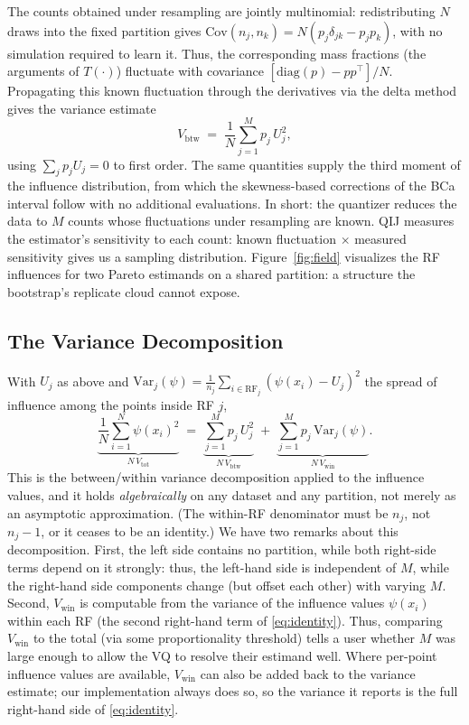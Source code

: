 \documentclass[runningheads]{llncs}
\newcommand{\ifl}{\psi}
\newcommand{\Vcell}{V_{\mathrm{btw}}}
\newcommand{\Vwithin}{V_{\mathrm{win}}}
\newcommand{\Vtotal}{V_{\mathrm{tot}}}
\begin{document}
The counts obtained under resampling are jointly multinomial: redistributing $N$ draws into the fixed partition gives $\mathrm{Cov}(n_j, n_k) = N(p_j \delta_{jk} - p_j p_k)$, with no simulation required to learn it. Thus, the corresponding mass fractions (the arguments of $T(\cdot)$) fluctuate with covariance $[\mathrm{diag}(p) - pp^{\top}]/N$. Propagating this known fluctuation through the derivatives via the delta method gives the variance estimate
\begin{equation}\label{eq:Vcell}
\Vcell \;=\; \frac1N \sum_{j=1}^{M} p_j\, U_j^{2},
\end{equation}
using $\sum_j p_j U_j = 0$ to first order. The same quantities supply the third moment of the influence distribution, from which the skewness-based corrections of the BCa interval \cite{efron1987} follow with no additional evaluations. In short: the quantizer reduces the data to $M$ counts whose fluctuations under resampling are known. QIJ measures the estimator's sensitivity to each count: known fluctuation $\times$ measured sensitivity gives us a sampling distribution. Figure~\ref{fig:field} visualizes the RF influences for two Pareto estimands on a shared partition: a structure the bootstrap's replicate cloud cannot expose.

\subsection{The Variance Decomposition}\label{sec:identity}

With $U_j$ as above and $\mathrm{Var}_j(\ifl) = \tfrac{1}{n_j}\sum_{i \in \mathrm{RF}_j}(\ifl(x_i) - U_j)^2$ the spread of influence among the points inside RF $j$,
\begin{equation}\label{eq:identity}
\underbrace{\frac1N\sum_{i=1}^{N} \ifl(x_i)^{2}}_{N\,\Vtotal}
\;=\;
\underbrace{\sum_{j=1}^{M} p_j\, U_j^{2}}_{N\,\Vcell}
\;+\;
\underbrace{\sum_{j=1}^{M} p_j\, \mathrm{Var}_j(\ifl)}_{N\,\Vwithin}.
\end{equation}
This is the between/within variance decomposition applied to the influence values, and it holds \emph{algebraically} on any dataset and any partition, not merely as an asymptotic approximation. (The within-RF denominator must be $n_j$, not $n_j{-}1$, or it ceases to be an identity.) We have two remarks about this decomposition. First, the left side contains no partition, while both right-side terms depend on it strongly: thus, the left-hand side is independent of $M$, while the right-hand side components change (but offset each other) with varying $M$. Second, $\Vwithin$ is computable from the variance of the influence values $\ifl(x_i)$ within each RF (the second right-hand term of \eqref{eq:identity}). Thus, comparing $\Vwithin$ to the total (via some proportionality threshold) tells a user whether $M$ was large enough to allow the VQ to resolve their estimand well. Where per-point influence values are available, $\Vwithin$ can also be added back to the variance estimate; our implementation always does so, so the variance it reports is the full right-hand side of \eqref{eq:identity}.
\end{document}
